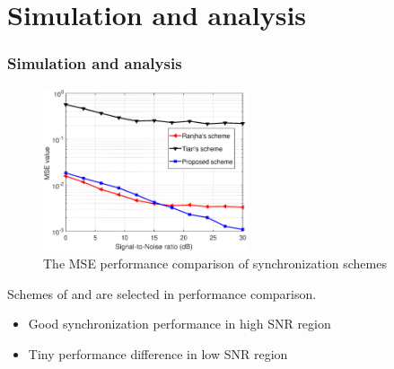\documentclass[8 pt]{beamer} %
\begin{document}
\section{Simulation and analysis}
\begin{frame}
\frametitle{Simulation and analysis}
\begin{figure}
    	\centering \includegraphics[width=6cm]{synchronization_mse.eps}
		\caption{The MSE performance comparison of synchronization schemes} \label{fig:synchronization_mse}
\end{figure}
 Schemes of \cite{Tian2008} and \cite{Ranjha2015} are selected in performance comparison.
 \begin{itemize}
 \item Good synchronization performance in high SNR region
 \item Tiny performance difference in low SNR region
 \end{itemize}
\end{frame}
\end{document}
